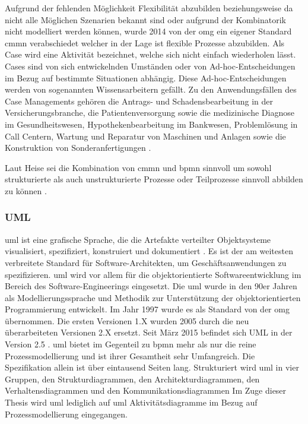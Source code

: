 \documentclass[a4paper, 12pt, twoside, headsepline=true]{scrartcl} %
\begin{document}
Aufgrund der fehlenden Möglichkeit Flexibilität abzubilden beziehungsweise da nicht alle Möglichen Szenarien bekannt sind oder aufgrund der Kombinatorik nicht modelliert werden können, wurde 2014 von der \ac{omg} ein eigener Standard \ac{cmmn} verabschiedet welcher in der Lage ist flexible Prozesse abzubilden. Als Case wird eine Aktivität bezeichnet, welche sich nicht einfach wiederholen lässt. Cases sind von sich entwickelnden Umständen oder von Ad-hoc-Entscheidungen im Bezug auf bestimmte Situationen abhängig. Diese Ad-hoc-Entscheidungen werden von sogenannten Wissensarbeitern gefällt. Zu den Anwendungsfällen des Case Managements gehören die Antrags- und Schadensbearbeitung in der Versicherungsbranche, die Patientenversorgung sowie die medizinische Diagnose im Gesundheitswesen,
Hypothekenbearbeitung im Bankwesen, Problemlösung in Call Centern, Wartung und Reparatur von Maschinen und Anlagen sowie die Konstruktion von Sonderanfertigungen\cite{cmmnomg} .

Laut Heise sei die Kombination von \ac{cmmn} und \ac{bpmn} sinnvoll um sowohl strukturierte als auch unstrukturierte Prozesse oder Teilprozesse sinnvoll abbilden zu können \cite{cmmnheise}.


\subsubsection{UML}

 \ac{uml} ist eine grafische Sprache, die die Artefakte verteilter Objektsysteme visualisiert, spezifiziert, konstruiert und dokumentiert \cite{Kleuker}. Es ist der am weitesten verbreitete Standard für Software-Architekten, um Geschäftsanwendungen zu spezifizieren. \ac{uml} wird vor allem für die objektorientierte Softwareentwicklung im Bereich des Software-Engineerings eingesetzt.
Die \ac{uml} wurde in den 90er Jahren als Modellierungssprache und Methodik zur Unterstützung der objektorientierten Programmierung entwickelt. Im Jahr 1997 wurde es als Standard von der \ac{omg} übernommen. Die ersten Versionen 1.X wurden 2005 durch die neu überarbeiteten Versionen 2.X ersetzt. Seit März 2015 befindet sich UML in der Version 2.5 \cite{omguml}. \ac{uml} bietet im Gegenteil zu \ac{bpmn} mehr als nur die reine Prozessmodellierung und ist ihrer Gesamtheit sehr Umfangreich. Die Spezifikation allein ist über eintausend Seiten lang. Strukturiert wird \ac{uml} in vier Gruppen, den  Strukturdiagrammen, den Architekturdiagrammen, den Verhaltensdiagrammen und den Kommunikationsdiagrammen %
Im Zuge dieser Thesis wird \ac{uml} lediglich auf \ac{uml} Aktivitätsdiagramme im Bezug auf Prozessmodellierung eingegangen.
\end{document}
